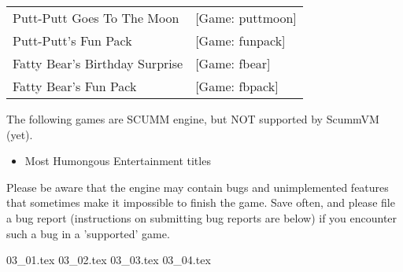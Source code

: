 \begin{itemize}
\begin{tabular}{ll}
  Putt-Putt Goes To The Moon&                    [Game: puttmoon]\\
  Putt-Putt's Fun Pack&                          [Game: funpack]\\
  Fatty Bear's Birthday Surprise&                [Game: fbear]\\
  Fatty Bear's Fun Pack&                         [Game: fbpack]\\
\end{tabular}

  The following games are SCUMM engine, but NOT supported by ScummVM (yet).
  \begin{itemize}
  \item Most Humongous Entertainment titles
  \end{itemize}
%
Please be aware that the engine may contain bugs and unimplemented features
that sometimes make it impossible to finish the game. Save often, and please
file a bug report (instructions on submitting bug reports are below) if you
encounter such a bug in a 'supported' game.
\end{itemize}
 {03_01.tex}
 {03_02.tex}
 {03_03.tex}
 {03_04.tex}


